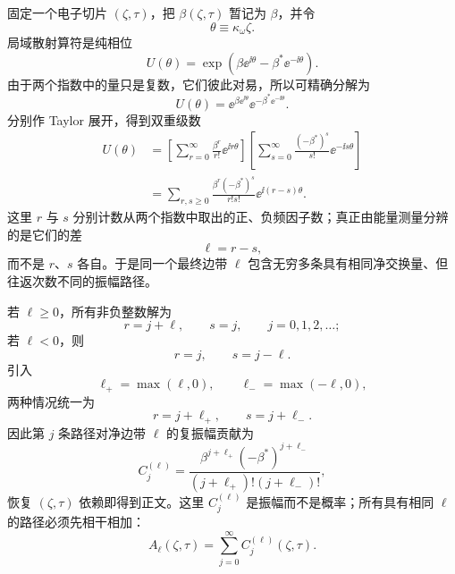











\begin{derivation}[有限脉冲散射的侧带振幅]
固定一个电子切片 $(\zeta,\tau)$，把 $\beta(\zeta,\tau)$ 暂记为 $\beta$，并令
\[
 \theta\equiv\kappa_\omega\zeta.
\]
局域散射算符是纯相位
\begin{equation*}
 U(\theta)=\exp\!\left(\beta \ee^{\ii\theta}-\beta^*\ee^{-\ii\theta}\right).
\end{equation*}
由于两个指数中的量只是复数，它们彼此对易，所以可精确分解为
\begin{equation*}
 U(\theta)
 =\ee^{\beta \ee^{\ii\theta}}
  \ee^{-\beta^*\ee^{-\ii\theta}}.
\end{equation*}
分别作 Taylor 展开，得到双重级数
\begin{align*}
 U(\theta)
 &=\left[\sum_{r=0}^{\infty}
 \frac{\beta^r}{r!}\ee^{\ii r\theta}\right]
 \left[\sum_{s=0}^{\infty}
 \frac{(-\beta^*)^s}{s!}\ee^{-\ii s\theta}\right]\\
 &=\sum_{r,s\ge0}
 \frac{\beta^r(-\beta^*)^s}{r!s!}
 \ee^{\ii(r-s)\theta}.
\end{align*}
这里 $r$ 与 $s$ 分别计数从两个指数中取出的正、负频因子数；真正由能量测量分辨的是它们的差
\[
 \ell=r-s,
\]
而不是 $r$、$s$ 各自。于是同一个最终边带 $\ell$ 包含无穷多条具有相同净交换量、但往返次数不同的振幅路径。

若 $\ell\ge0$，所有非负整数解为
\[
 r=j+\ell,\qquad s=j,
 \qquad j=0,1,2,\ldots;
\]
若 $\ell<0$，则
\[
 r=j,\qquad s=j-\ell.
\]
引入
\[
 \ell_+=\max(\ell,0),
 \qquad
 \ell_-=\max(-\ell,0),
\]
两种情况统一为
\[
 r=j+\ell_+,
 \qquad
 s=j+\ell_-.
\]
因此第 $j$ 条路径对净边带 $\ell$ 的复振幅贡献为
\begin{equation*}
 C_j^{(\ell)}
 =\frac{\beta^{j+\ell_+}(-\beta^*)^{j+\ell_-}}
 {(j+\ell_+)!(j+\ell_-)!},
\end{equation*}
恢复 $(\zeta,\tau)$ 依赖即得到正文。这里 $C_j^{(\ell)}$ 是振幅而不是概率；所有具有相同 $\ell$ 的路径必须先相干相加：
\begin{equation*}
 A_\ell(\zeta,\tau)
 =\sum_{j=0}^{\infty}C_j^{(\ell)}(\zeta,\tau).
\end{equation*}


\end{derivation}
